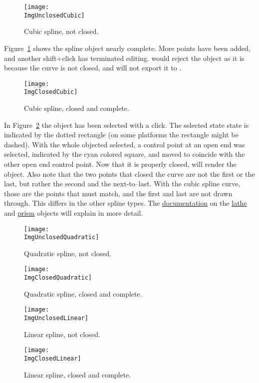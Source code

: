 		\begin{figure}[htbp]
		\centering
		\texttt{[image: \\ImgUnclosedCubic]}
		\caption{Cubic spline, not closed.}
		\label{fig:first_cubic_unclosed}
		\end{figure}

		Figure~\ref{fig:first_cubic_unclosed} shows the spline
		object nearly complete. More points have been added,
		and another shift+click
		has terminated editing. \IXpov{} would reject the object
		as it is because the curve is not closed, and \IXpkg{}
		will not export it to .

		\begin{figure}[htbp]
		\centering
		\texttt{[image: \\ImgClosedCubic]}
		\caption{Cubic spline, closed and complete.}
		\label{fig:first_cubic_closed}
		\end{figure}
		
		In Figure~\ref{fig:first_cubic_closed} the object has
		been selected with a click. The selected state state is
		indicated by the dotted rectangle (on some platforms the
		rectangle might be dashed). With the whole objected
		selected, a control point at an open end was selected,
		indicated by the cyan colored square, and moved to coincide
		with the other open end control point. Now that it
		is properly closed, \IXpov{} will render the object.
		Also note that the two points that closed the curve are
		not the first or the last, but rather the second and
		the next-to--last. With the cubic spline curve, those
		are the points that must match, and the first and last
		are not drawn through. This differs in the other
		spline types. The
		\IXpov{} \href{\URLPOVdocs}{documentation}
		on the
		\href{\URLPOVdocsLathe}{lathe}
		and
		\href{\URLPOVdocsPrism}{prism}
		objects will explain in more detail.

		\begin{figure}[p]
		\centering
		\texttt{[image: \\ImgUnclosedQuadratic]}
		\caption{Quadratic spline, not closed.}
		\label{fig:first_quadratic_unclosed}
		\vspace{16pt}
		\texttt{[image: \\ImgClosedQuadratic]}
		\caption{Quadratic spline, closed and complete.}
		\label{fig:first_quadratic_closed}
		\end{figure}

		\begin{figure}[p]
		\centering
		\texttt{[image: \\ImgUnclosedLinear]}
		\caption{Linear spline, not closed.}
		\label{fig:first_linear_unclosed}
		\vspace{16pt}
		\texttt{[image: \\ImgClosedLinear]}
		\caption{Linear spline, closed and complete.}
		\label{fig:first_linear_closed}
		\end{figure}

